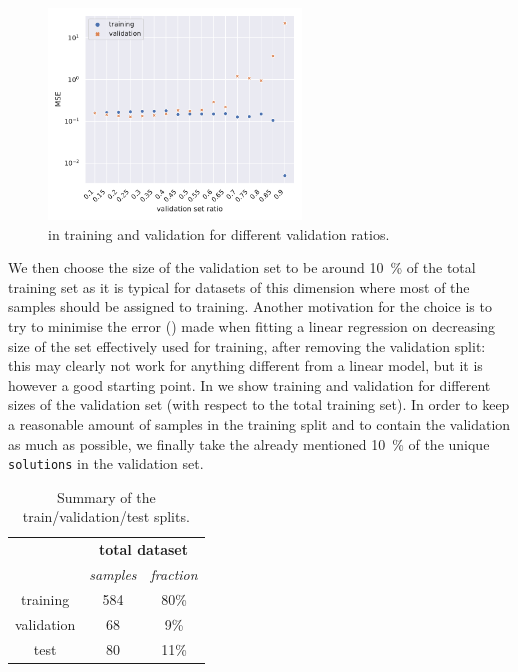 \begin{figure}[htbp]
  \centering
  \includegraphics[width=0.6\textwidth]{img/valsize_errors}
  \caption{\mse in training and validation for different validation ratios.}
  \label{fig:lumps:validation_size}
\end{figure}

We then choose the size of the validation set to be around \SI{10}{\percent} of the total training set as it is typical for datasets of this dimension where most of the samples should be assigned to training.
Another motivation for the choice is to try to minimise the error (\mse) made when fitting a linear regression on decreasing size of the set effectively used for training, after removing the validation split: this may clearly not work for anything different from a linear model, but it is however a good starting point.
In  we show training and validation \mse for different sizes of the validation set (with respect to the total training set).
In order to keep a reasonable amount of samples in the training split and to contain the validation \mse as much as possible, we finally take the already mentioned \SI{10}{\percent} of the unique \texttt{solutions} in the validation set.

\begin{table}[htbp]
\centering
\begin{tabular}{@{}ccc@{}}
\toprule
           & \multicolumn{2}{c}{\textbf{total dataset}} \\
           & \textit{samples}    & \textit{fraction}    \\
\midrule
training   & 584                 & 80\%                 \\
validation & 68                  & 9\%                  \\
test       & 80                  & 11\%                 \\
\bottomrule
\end{tabular}
\caption{Summary of the train/validation/test splits.}
\label{tab:lumps:splits}
\end{table}

